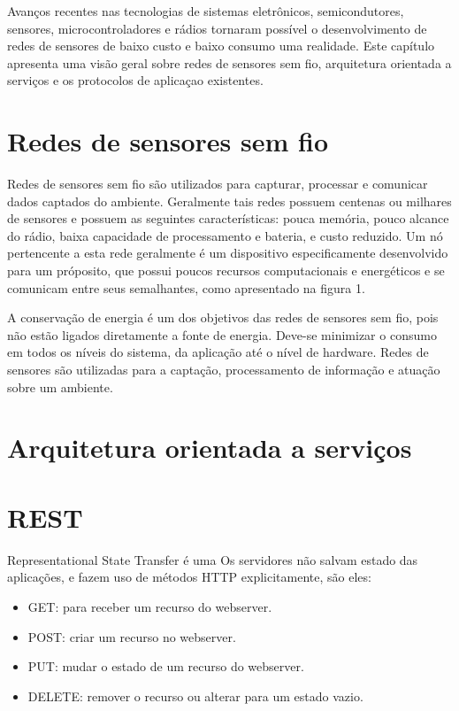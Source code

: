 Avan\c{c}os recentes nas tecnologias de sistemas eletr\^onicos, semicondutores, sensores, microcontroladores e r\'adios tornaram poss\'ivel o desenvolvimento de redes de sensores de baixo custo e baixo consumo uma realidade.
Este cap\'itulo apresenta uma vis\~ao geral sobre redes de sensores sem fio, arquitetura orientada a servi\c{c}os e os protocolos de aplica\c{c}ao existentes.
\section{Redes de sensores sem fio}

Redes de sensores sem fio s\~ao utilizados para capturar, processar e comunicar dados captados do ambiente. Geralmente tais redes possuem centenas ou milhares de sensores e possuem as seguintes caracter\'isticas: pouca mem\'oria, pouco alcance do r\'adio, baixa capacidade de processamento e bateria, e custo reduzido. Um n\'o pertencente a esta rede geralmente \'e um dispositivo especificamente desenvolvido para um pr\'oposito, que possui poucos recursos computacionais e energ\'eticos e se comunicam entre seus semalhantes, como apresentado na figura 1.


A conserva\c{c}\~ao de energia \'e um dos objetivos das redes de sensores sem fio, pois n\~ao est\~ao ligados diretamente a fonte de energia. Deve-se minimizar o consumo em todos os n\'iveis do sistema, da aplica\c{c}\~ao at\'e o n\'ivel de hardware. Redes de sensores s\~ao utilizadas para a capta\c{c}\~ao, processamento de informa\c{c}\~ao e atua\c{c}\~ao sobre um ambiente.

\section{Arquitetura orientada a servi\c{c}os}
\cite{perrey2003service}




\section{REST}



Representational State Transfer \'e uma 
Os servidores n\~ao salvam estado das aplica\c{c}\~oes, e fazem uso de m\'etodos HTTP explicitamente, s\~ao eles:
\begin{itemize}
    \item GET: para receber um recurso do webserver.
    \item POST: criar um recurso no webserver.
    \item PUT: mudar o estado de um recurso do webserver.
    \item DELETE: remover o recurso ou alterar para um estado vazio.
\end{itemize}

